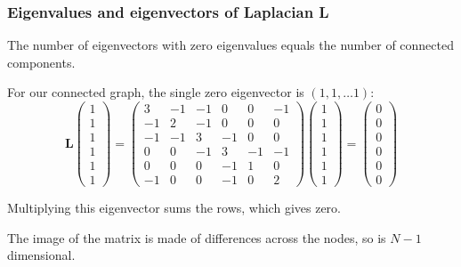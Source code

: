 \documentclass[10pt,aspectratio=169,dvipsnames]{beamer}
\begin{document}
\begin{frame}
  \frametitle{Eigenvalues and eigenvectors of Laplacian L}

  The number of eigenvectors with zero eigenvalues equals the number of connected components.

  For our connected graph, the single zero eigenvector is $(1,1,\dots 1)$:
\begin{equation*}
\mathbf{L}  \left(\begin{matrix}
1 \\
1 \\
1 \\
1 \\
1 \\
1
\end{matrix}\right)=\left(\begin{matrix}
3 & -1 & -1 & 0 & 0 & -1\\
-1 & 2 & -1 & 0 & 0 & 0\\
-1 & -1 & 3 & -1 & 0 & 0\\
0 & 0 & -1 & 3 & -1 & -1\\
0 & 0 & 0 & -1 & 1 & 0\\
-1 & 0 & 0 & -1 & 0 & 2
\end{matrix}\right)  \left(\begin{matrix}
1 \\
1 \\
1 \\
1 \\
1 \\
1
\end{matrix}\right)= \left(\begin{matrix}
0 \\
0 \\
0 \\
0 \\
0 \\
0
\end{matrix}\right)
\end{equation*}

Multiplying this eigenvector sums the rows, which gives zero.

The image of the matrix is made of differences across the nodes, so is $N-1$ dimensional.

\end{frame}
\end{document}
